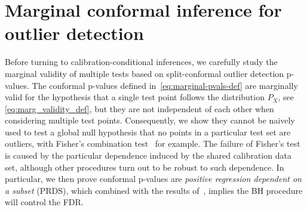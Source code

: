 \documentclass[11pt]{article}
\begin{document}




\section{Marginal conformal inference for outlier detection}
\label{sec:marginal_pvals}

Before turning to calibration-conditional inferences, we carefully study the marginal validity of multiple tests based on split-conformal outlier detection p-values. The conformal p-values defined in~\eqref{eq:marginal-pvals-def} are marginally valid for the hypothesis that a single test point follows the distribution $P_X$, see \eqref{eq:marg_validity_def}, but they are not independent of each other when considering multiple test points. Consequently, we show they cannot be naively used to test a global null hypothesis that no points in a particular test set are outliers, with Fisher's combination test~\cite{fisher1925statistical} for example.
The failure of Fisher's test is caused by the particular dependence induced by the shared calibration data set, although other procedures turn out to be robust to such dependence. In particular, we then prove conformal p-values are \emph{positive regression dependent on a subset} (PRDS), which combined with the results of~\cite{benjamini2001control}, implies the BH procedure will control the FDR.


\end{document}
